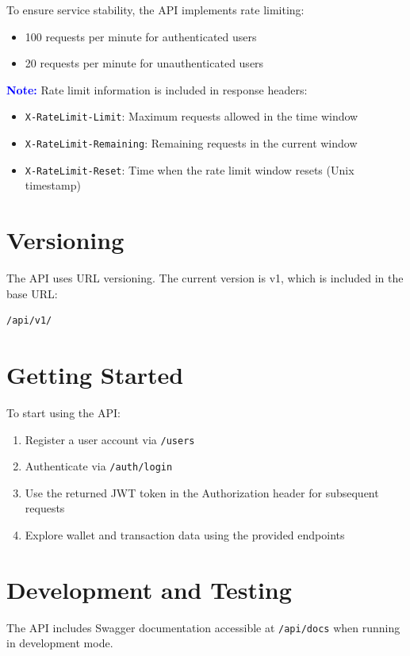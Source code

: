 To ensure service stability, the API implements rate limiting:
\begin{itemize}
    \item 100 requests per minute for authenticated users
    \item 20 requests per minute for unauthenticated users
\end{itemize}
\begin{tcolorbox}[width=\textwidth, boxrule=0.5pt, colback=gray!5, colframe=gray!50]
\small %
\textbf{\textcolor{blue}{Note:}} Rate limit information is included in response headers:
\begin{itemize}
    \item \texttt{X-RateLimit-Limit}: Maximum requests allowed in the time window
    \item \texttt{X-RateLimit-Remaining}: Remaining requests in the current window
    \item \texttt{X-RateLimit-Reset}: Time when the rate limit window resets (Unix timestamp)
\end{itemize}
\end{tcolorbox}
\section{Versioning}
The API uses URL versioning. The current version is v1, which is included in the base URL:
  \begin{tcolorbox}[width=\textwidth, boxrule=0.5pt, colback=gray!5, colframe=gray!50]
\begin{verbatim}
/api/v1/
\end{verbatim}
\end{tcolorbox}
\section{Getting Started}

 To start using the API:

\begin{enumerate}
  \item Register a user account via \colorbox{yellow!30}{\texttt{/users}}
  \item Authenticate via \colorbox{yellow!30}{\texttt{/auth/login}}
  \item Use the returned JWT token in the Authorization header for subsequent requests
  \item Explore wallet and transaction data using the provided endpoints
\end{enumerate}
\section{Development and Testing}
The API includes Swagger documentation accessible at  \colorbox{yellow!30}{\texttt{/api/docs}} when running in development mode.